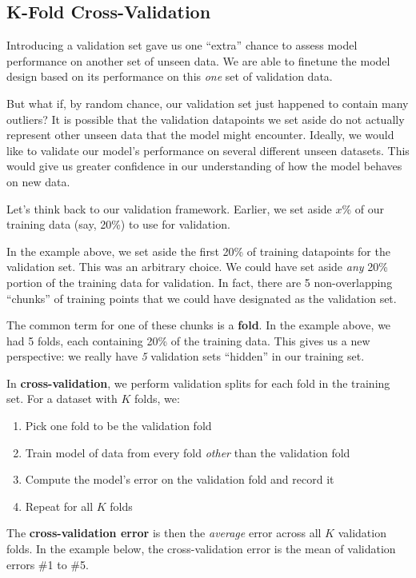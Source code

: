 \documentclass[
  letterpaper,
  DIV=11,
  numbers=noendperiod]{scrreprt}
\providecommand{\tightlist}{%
  \setlength{\itemsep}{0pt}\setlength{\parskip}{0pt}}\usepackage{longtable,booktabs,array}
\begin{document}
\subsection{K-Fold Cross-Validation}\label{k-fold-cross-validation}

Introducing a validation set gave us one ``extra'' chance to assess
model performance on another set of unseen data. We are able to finetune
the model design based on its performance on this \emph{one} set of
validation data.

But what if, by random chance, our validation set just happened to
contain many outliers? It is possible that the validation datapoints we
set aside do not actually represent other unseen data that the model
might encounter. Ideally, we would like to validate our model's
performance on several different unseen datasets. This would give us
greater confidence in our understanding of how the model behaves on new
data.

Let's think back to our validation framework. Earlier, we set aside
\(x\)\% of our training data (say, 20\%) to use for validation.

In the example above, we set aside the first 20\% of training datapoints
for the validation set. This was an arbitrary choice. We could have set
aside \emph{any} 20\% portion of the training data for validation. In
fact, there are 5 non-overlapping ``chunks'' of training points that we
could have designated as the validation set.

The common term for one of these chunks is a \textbf{fold}. In the
example above, we had 5 folds, each containing 20\% of the training
data. This gives us a new perspective: we really have \emph{5}
validation sets ``hidden'' in our training set.

In \textbf{cross-validation}, we perform validation splits for each fold
in the training set. For a dataset with \(K\) folds, we:

\begin{enumerate}
\def\labelenumi{\arabic{enumi}.}
\tightlist
\item
  Pick one fold to be the validation fold
\item
  Train model of data from every fold \emph{other} than the validation
  fold
\item
  Compute the model's error on the validation fold and record it
\item
  Repeat for all \(K\) folds
\end{enumerate}

The \textbf{cross-validation error} is then the \emph{average} error
across all \(K\) validation folds. In the example below, the
cross-validation error is the mean of validation errors \#1 to \#5.
\end{document}
